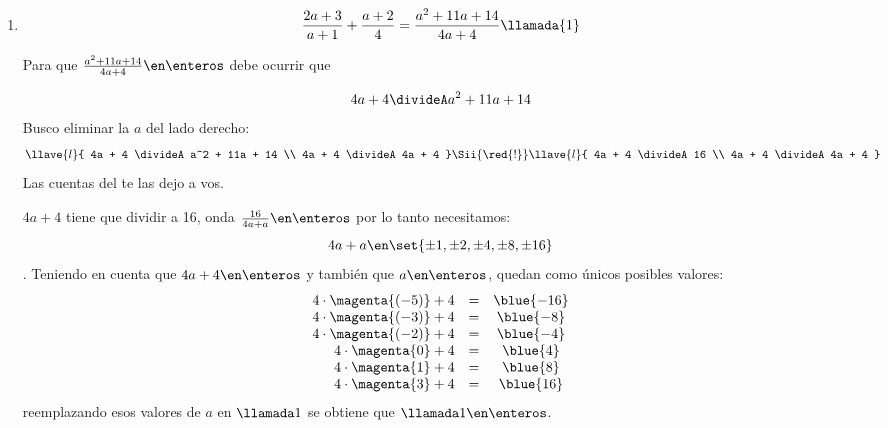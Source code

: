 \begin{enumerate}[label=\enumeracion*)]
  \item
        $$
          \frac{2a + 3}{a+1} + \frac{a+2}{4} = \frac{a^2 + 11a + 14}{4a+4} \llamada{1}
        $$

        Para que $\frac{a^2 + 11a + 14}{4a+4} \en \enteros$ debe ocurrir que

        $$
          4a + 4 \divideA a^2 + 11a + 14
        $$
        Busco eliminar la $a$ del lado derecho:
        $$
          \llave{l}{
            4a + 4 \divideA a^2 + 11a + 14 \\
            4a + 4 \divideA 4a + 4
          }
          \Sii{\red{!}}
          \llave{l}{
            4a + 4 \divideA 16 \\
            4a + 4 \divideA 4a + 4
          }
        $$
        Las cuentas del \red{!} te las dejo a vos.

        $4a+4$ tiene que dividir a 16, onda $\frac{16}{4a + a} \en \enteros$ por lo tanto necesitamos:
        $$
          4a + a \en \set{\pm1,\pm2,\pm4,\pm8,\pm16}
        $$.
        Teniendo en cuenta que $4a + 4 \en \enteros$ y también que $a \en \enteros$, quedan como únicos posibles valores:
        $$
          \begin{array}{rcc}
            4 \cdot \magenta{(-5)} + 4 & = & \blue{-16} \\
            4 \cdot \magenta{(-3)} + 4 & = & \blue{-8}  \\
            4 \cdot \magenta{(-2)} + 4 & = & \blue{-4}  \\
            4 \cdot \magenta{0} + 4    & = & \blue{4}   \\
            4 \cdot \magenta{1} + 4    & = & \blue{8}   \\
            4 \cdot \magenta{3} + 4    & = & \blue{16}
          \end{array}
        $$
        reemplazando esos valores de $a$ en $\llamada1$ se obtiene que  $ \llamada1 \en \enteros$.
\end{enumerate}

\begin{aportes}
  \item {}
  \item {}
\end{aportes}
